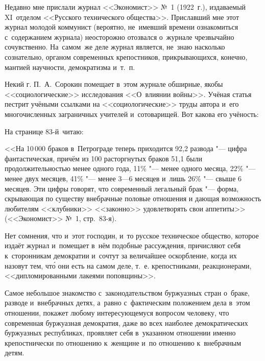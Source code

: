 \begin{midsloppypar}
Недавно мне прислали журнал <<Экономист>> №~1 (1922~г.),
издаваемый XI~отделом <<Русского технического общества>>. Приславший мне этот
журнал молодой коммунист (вероятно, не~имевший времени ознакомиться
с~содержанием журнала) неосторожно отозвался о~журнале чрезвычайно
сочувственно. На~самом~же деле журнал является, не~знаю насколько
сознательно, органом современных крепостников, прикрывающихся, конечно,
мантией научности, демократизма и~т.~п.
\end{midsloppypar}

Некий г. П.~А.~Сорокин помещает в~этом журнале обширные, якобы
<<социологические>> исследования <<О~влиянии войны>>. Учёная статья
пестрит учёными ссылками на <<социологические>> труды автора и~его
многочисленных заграничных учителей и~сотоварищей. Вот какова его учёность:

На странице 83-й~читаю:

\medskip
{\small
<<На 10\,000 браков в~Петрограде теперь приходится 92,2 развода "--- цифра
фантастическая, причём из 100 расторгнутых браков 51,1 были
продолжительностью менее одного года, 11\% "--- менее одного месяца,
22\% "--- менее двух месяцев, 41\% "--- менее 3---6 месяцев и~лишь
26\% "--- свыше 6 месяцев. Эти цифры говорят, что современный легальный
брак "--- форма, скрывающая по существу внебрачные половые отношения и
дающая возможность любителям <<клубники>> <<законно>> удовлетворять свои
аппетиты>> (<<Экономист>> №~1, стр.~83-я).}
\medskip

Нет сомнения, что и~этот господин, и~то русское техническое общество,
которое издаёт журнал и~помещает в~нём подобные рассуждения, причисляют
себя к~сторонникам демократии и~сочтут за величайшее оскорбление, когда их
назовут тем, чт\'{о} они есть на самом деле, т.~е. крепостниками,
реакционерами, <<дипломированными лакеями поповщины>>.

Самое небольшое знакомство с~законодательством буржуазных стран о~браке,
разводе и~внебрачных детях, а~равно с~фактическим положением дела в~этом
отношении, покажет любому интересующемуся вопросом человеку, что
современная буржуазная демократия, даже во всех наиболее демократических
буржуазных республиках, проявляет себя в~указанном отношении именно
крепостнически по отношению к~женщине и~по отношению к~внебрачным детям.

